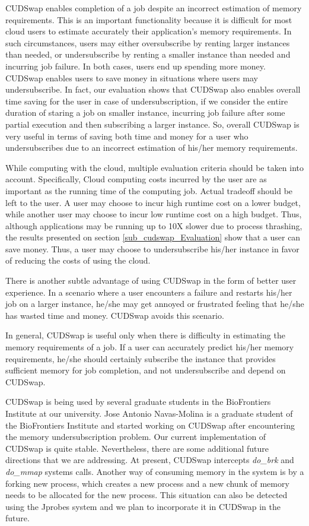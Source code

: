 CUDSwap enables completion of a job despite an incorrect estimation of memory
requirements. This is an important functionality because it is
difficult for most cloud users to estimate accurately their application's
memory requirements. In such circumstances, users may either oversubscribe
by renting larger instances than needed, or undersubscribe by renting a
smaller instance than needed and incurring job failure. In both cases, users
end up spending more money. CUDSwap enables users to save money in
situations where users may undersubscribe. In fact, our evaluation shows
that CUDSwap also enables overall time saving for the user in case of
undersubscription, if we consider the entire duration of staring a job
on smaller instance, incurring job failure after some partial execution and
then subscribing a larger instance. So, overall CUDSwap is very useful
in terms of saving both time and money for a user who undersubscribes
due to an incorrect estimation of his/her memory requirements.

While computing with the cloud, multiple evaluation criteria should be taken
into account. Specifically, Cloud computing costs incurred by the user are
as important as the running time of the computing job.
Actual tradeoff should be left to the user. A user may choose to incur
high runtime cost on a lower budget, while another user may choose to incur
low runtime cost on a high budget.
Thus, although applications may be running up to 10X slower due to process
thrashing, the results presented on section \ref{sub_cudswap_Evaluation} show that
a user can save money. Thus, a user may choose to undersubscribe his/her
instance in favor of reducing the costs of using the cloud.

There is another subtle advantage of using CUDSwap in the form of better
user experience. In a scenario where a user encounters a failure and restarts
his/her job on a larger instance, he/she may get annoyed or frustrated
feeling that he/she has wasted time and money. CUDSwap avoids this
scenario.

In general, CUDSwap is useful only when there is difficulty in estimating the
memory requirements of a job. If a user can accurately predict his/her
memory requirements, he/she should certainly subscribe the instance
that provides sufficient memory for job completion, and not undersubscribe
and depend on CUDSwap.

CUDSwap is being used
by several graduate students in the BioFrontiers Institute at our university.
Jose Antonio Navas-Molina is a graduate student of the
BioFrontiers Institute and started working on CUDSwap after encountering
the memory undersubscription problem.
Our current implementation of CUDSwap is quite stable.
Nevertheless, there are some
additional future directions that we are addressing. At present,
CUDSwap intercepts {\it do\_brk} and {\it do\_mmap} systems calls.
Another way of consuming memory in the system is by a forking new
process, which creates a new process and a new chunk of memory needs to
be allocated for the new process. This situation can also be detected using
the Jprobes system and we plan to incorporate it in CUDSwap in the future.

